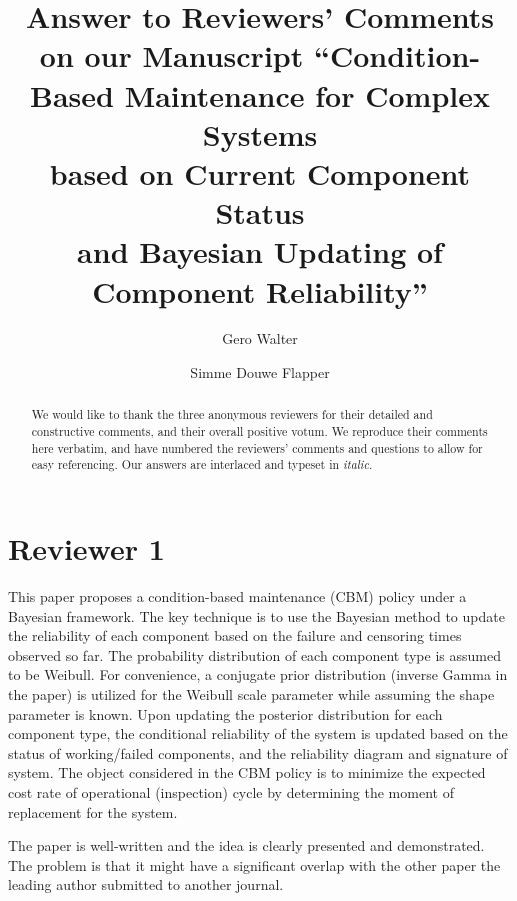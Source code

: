 \documentclass[authoryear]{elsarticle}
\begin{document}

\begin{frontmatter}
\title{Answer to Reviewers' Comments on our Manuscript
``Condition-Based Maintenance for Complex Systems\\ based on Current Component Status\\ and Bayesian Updating of Component Reliability''}

\author[tue]{Gero Walter}
\author[tue]{Simme Douwe Flapper}

\address[tue]{School of Industrial Engineering, Eindhoven University of Technology,\\ Eindhoven, The Netherlands}


\begin{abstract}
We would like to thank the three anonymous reviewers for their detailed and constructive comments,
and their overall positive votum.
We reproduce their comments here verbatim,
and have numbered the reviewers' comments and questions to allow for easy referencing. 
Our answers are interlaced and typeset in \emph{italic}.
\end{abstract}
\end{frontmatter}


\section*{Reviewer 1}

This paper proposes a condition-based maintenance (CBM) policy under a Bayesian framework. The key technique is to use the Bayesian method to update the reliability of each component based on the failure and censoring times observed so far. The probability distribution of each component type is assumed to be Weibull. For convenience, a conjugate prior distribution (inverse Gamma in the paper) is utilized for the Weibull scale parameter while assuming the shape parameter is known. Upon updating the posterior distribution for each component type, the conditional reliability of the system is updated based on the status of working/failed components, and the reliability diagram and signature of system. The object considered in the CBM policy is to minimize the expected cost rate of operational (inspection) cycle by determining the moment of replacement for the system.

The paper is well-written and the idea is clearly presented and demonstrated.
The problem is that it might have a significant overlap with the other paper the leading author submitted to another journal.
\end{document}
